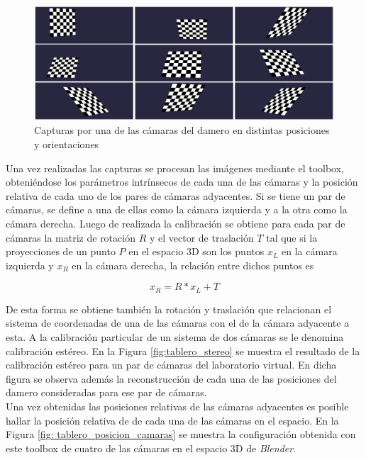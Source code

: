 \begin{figure}[ht!]
\begin{center}
\includegraphics[scale=0.08]{img/calibracion/tablero_posiciones.png}
\end{center}
\caption{Capturas por una de las cámaras del damero en distintas posiciones y orientaciones }
\label{fig: tablero_posiciones}
\end{figure}


Una vez realizadas las capturas se procesan  las imágenes mediante el toolbox, obteniéndose los parámetros intrínsecos de cada una de las cámaras y la posición relativa de cada uno de los pares de cámaras adyacentes. Si se tiene un par de cámaras, se define a una de ellas como la cámara izquierda y a la otra como la cámara derecha. Luego de realizada la calibración se obtiene para cada par de cámaras la matriz de rotación $R$ y el vector de traslación $T$ tal que si la proyecciones de un punto $P$ en el espacio 3D son los puntos $x_L$ en la cámara izquierda y $x_R$ en la cámara derecha, la relación entre dichos puntos es

\[ x_R = R * 
x_L + T\]

De esta forma se obtiene también la rotación y traslación que relacionan el sistema de coordenadas de una de las cámaras con el de la cámara adyacente a esta. A la calibración particular de un sistema de dos cámaras se le denomina calibración estéreo. En la Figura \ref{fig:tablero_stereo} se muestra el resultado de la calibración estéreo para un par de cámaras del laboratorio virtual. En dicha figura se observa además la reconstrucción de cada una de las posiciones del damero consideradas para ese par de cámaras.\\

Una vez obtenidas las posiciones relativas de las cámaras adyacentes es posible hallar la posición relativa de de cada una de  las cámaras en el espacio. En la Figura  \ref{fig: tablero_posicion_camaras} se muestra la configuración obtenida con este toolbox de cuatro de las cámaras en el espacio 3D de \emph{Blender}.

